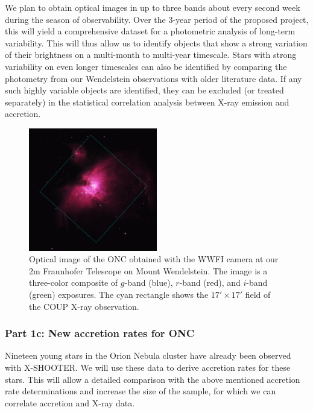 \documentclass[10pt,fleqn,twoside]{article}
\begin{document}
We plan to obtain optical images in up to three bands 
about every second week during the season of observability.
Over the 3-year period of the proposed project, this will yield
a comprehensive dataset for a photometric analysis of long-term
variability.
This will thus
allow us to identify objects that show a strong
variation of their brightness on a multi-month to multi-year timescale.
Stars with strong variability on even longer timescales can also be
identified by comparing the photometry from our Wendelstein observations
with older literature data.
%
If any such highly variable objects are identified, they can be excluded
(or treated separately) in the statistical correlation analysis
between X-ray emission and accretion.


\begin{figure} %
\centering
\includegraphics[width=0.5\textwidth]{onc-coupfield-2.ps}
\caption{Optical image of the ONC obtained with the WWFI camera
at our 2m Fraunhofer Telescope on Mount Wendelstein.
The image is a three-color composite of $g$-band (blue), $r$-band
(red), and $i$-band (green) exposures.
The cyan rectangle shows the $17' \times 17'$
field of the COUP X-ray observation.
\label{onc-wwfi.fig}}
\end{figure} %




\bigskip

\subsubsection*{Part 1c: New accretion rates for ONC}


Nineteen young stars in the Orion Nebula cluster have already been
observed with X-SHOOTER.
We will use these data to derive accretion rates for these stars.
This will allow a detailed comparison with the above mentioned accretion rate
determinations and increase the size of the sample, for which we
can correlate accretion and X-ray data.
\medskip
\end{document}
